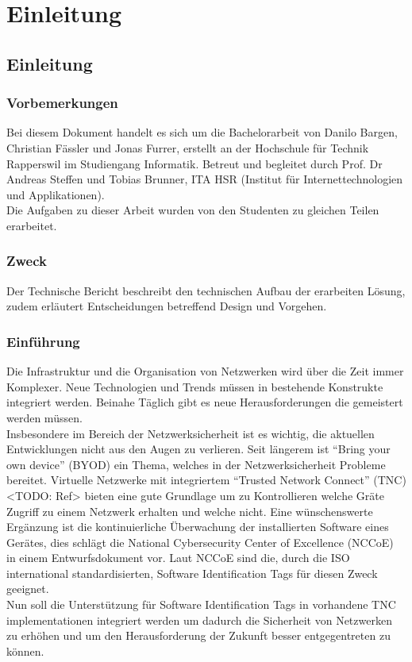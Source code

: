 \chapter{Einleitung}
\section{Einleitung}

\subsection{Vorbemerkungen}
Bei diesem Dokument handelt es sich um die Bachelorarbeit von Danilo Bargen,
Christian Fässler und Jonas Furrer, erstellt an der Hochschule für Technik Rapperswil 
im Studiengang Informatik. Betreut und begleitet durch Prof. Dr
Andreas Steffen und Tobias Brunner, ITA HSR (Institut für Internettechnologien
und Applikationen).\\
Die Aufgaben zu dieser Arbeit wurden von den Studenten zu gleichen Teilen
erarbeitet.

\subsection{Zweck}
Der Technische Bericht beschreibt den technischen Aufbau der erarbeiten Lösung,
zudem erläutert Entscheidungen betreffend Design und Vorgehen.

\subsection{Einführung}
Die Infrastruktur und die Organisation von Netzwerken wird über die Zeit immer
Komplexer. Neue Technologien und Trends müssen in bestehende Konstrukte
integriert werden. Beinahe Täglich gibt es  neue Herausforderungen die
gemeistert werden müssen.\\
Insbesondere im Bereich der Netzwerksicherheit ist es wichtig, die aktuellen
Entwicklungen nicht aus den Augen zu verlieren. Seit längerem ist \enquote{Bring
your own device} (BYOD) ein Thema, welches in der Netzwerksicherheit Probleme
bereitet. Virtuelle Netzwerke mit integriertem \enquote{Trusted Network Connect}
(TNC) <TODO: Ref> bieten eine gute Grundlage um zu Kontrollieren welche Gräte
Zugriff zu einem Netzwerk erhalten und welche nicht. Eine wünschenswerte
Ergänzung ist die kontinuierliche Überwachung der installierten Software eines
Gerätes, dies schlägt die National Cybersecurity Center of Excellence (NCCoE) in
einem Entwurfsdokument vor. Laut NCCoE sind die, durch die ISO international
standardisierten, Software Identification Tags für diesen Zweck geeignet.\\
Nun soll die Unterstützung für Software Identification Tags in vorhandene TNC
implementationen integriert werden um dadurch die Sicherheit von Netzwerken zu
erhöhen und um den Herausforderung der Zukunft besser entgegentreten zu können.